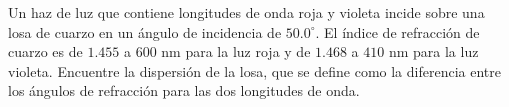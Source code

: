 \item Un haz de luz que contiene longitudes de onda roja y violeta incide sobre una losa de cuarzo en un ángulo de incidencia de $50.0^\circ$. El índice de refracción de cuarzo es de $1.455$ a $600\text{ nm}$ para la luz roja y de $1.468$ a $410\text{ nm}$ para la luz violeta. Encuentre la dispersión de la losa, que se define como la diferencia entre los ángulos de refracción para las dos longitudes de onda.